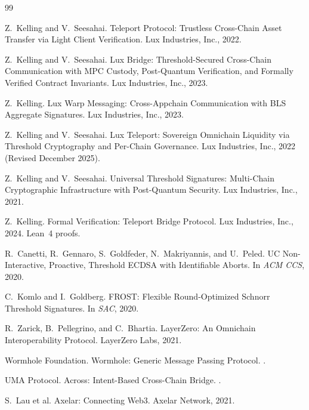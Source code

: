 
\begin{thebibliography}{99}

Z.~Kelling and V.~Seesahai.
\newblock Teleport Protocol: Trustless Cross-Chain Asset Transfer via Light Client Verification.
\newblock Lux Industries, Inc., 2022.

Z.~Kelling and V.~Seesahai.
\newblock Lux Bridge: Threshold-Secured Cross-Chain Communication with MPC Custody, Post-Quantum Verification, and Formally Verified Contract Invariants.
\newblock Lux Industries, Inc., 2023.

Z.~Kelling.
\newblock Lux Warp Messaging: Cross-Appchain Communication with BLS Aggregate Signatures.
\newblock Lux Industries, Inc., 2023.

Z.~Kelling and V.~Seesahai.
\newblock Lux Teleport: Sovereign Omnichain Liquidity via Threshold Cryptography and Per-Chain Governance.
\newblock Lux Industries, Inc., 2022 (Revised December 2025).

Z.~Kelling and V.~Seesahai.
\newblock Universal Threshold Signatures: Multi-Chain Cryptographic Infrastructure with Post-Quantum Security.
\newblock Lux Industries, Inc., 2021.

Z.~Kelling.
\newblock Formal Verification: Teleport Bridge Protocol.
\newblock Lux Industries, Inc., 2024. Lean~4 proofs.

R.~Canetti, R.~Gennaro, S.~Goldfeder, N.~Makriyannis, and U.~Peled.
\newblock UC Non-Interactive, Proactive, Threshold ECDSA with Identifiable Aborts.
\newblock In \emph{ACM CCS}, 2020.

C.~Komlo and I.~Goldberg.
\newblock FROST: Flexible Round-Optimized Schnorr Threshold Signatures.
\newblock In \emph{SAC}, 2020.

R.~Zarick, B.~Pellegrino, and C.~Bhartia.
\newblock LayerZero: An Omnichain Interoperability Protocol.
\newblock LayerZero Labs, 2021.

Wormhole Foundation.
\newblock Wormhole: Generic Message Passing Protocol.
.

UMA Protocol.
\newblock Across: Intent-Based Cross-Chain Bridge.
.

S.~Lau et al.
\newblock Axelar: Connecting Web3.
\newblock Axelar Network, 2021.

\end{thebibliography}

